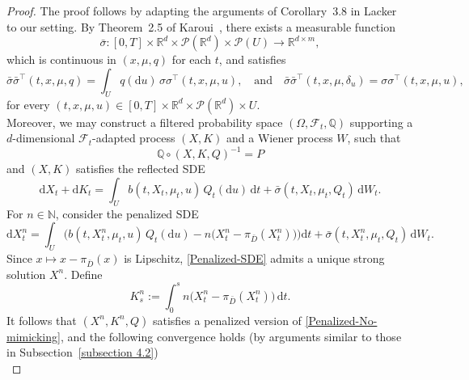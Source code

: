 \documentclass[11pt,amsfonts]{article}
\theoremstyle{plain}
\theoremstyle{assumpstyle}
\numberwithin{equation}{section}
\numberwithin{theorem}{section}
\numberwithin{proposition}{section}
\numberwithin{definition}{section}
\numberwithin{remark}{section}
\numberwithin{corollary}{section}
\numberwithin{lemma}{section}
\begin{document}
\begin{proof} The proof follows by adapting the arguments of Corollary~3.8 in Lacker~\cite{laker} to our setting. By Theorem~2.5 of Karoui~\cite{Mel}, there exists a measurable function 
\begin{equation*}
\bar{\sigma} : [0,T] \times \mathbb{R}^d \times \mathcal{P}(\mathbb{R}^d) \times \mathcal{P}(U) \to \mathbb{R}^{d \times m}, 
\end{equation*}
which is continuous in $(x,\mu,q)$ for each $t$, and satisfies 
\begin{equation*} 
\bar{\sigma} \bar{\sigma}^{\top}(t, x, \mu, q) = \int_{U} q(\mathrm{d}u)\, \sigma\sigma^{\top}(t, x, \mu, u), \quad\text{and}\quad \bar{\sigma} \bar{\sigma}^{\top}(t, x, \mu, \delta_{u}) = \sigma\sigma^{\top}(t, x, \mu, u), 
\end{equation*} 
for every $(t, x, \mu, u) \in [0,T] \times \mathbb{R}^d \times \mathcal{P}(\mathbb{R}^d) \times U$.\\
Moreover, we may construct a filtered probability space $(\Omega, \mathcal{F}_t, \mathbb{Q})$ supporting a $d$-dimensional $\mathcal{F}_t$-adapted process $(X, K)$ and a Wiener process $W$, such that
\begin{equation*} 
\mathbb{Q} \circ (X, K, Q)^{-1} = P 
\end{equation*}
and $(X,K)$ satisfies the reflected SDE \begin{equation} \label{Penalized-No-mimicking}  \displaystyle \mathrm{d}X_t+ \mathrm{d}K_t = \int_{U} b(t, X_t, \mu_t, u)\, Q_t(\mathrm{d}u)\, \mathrm{d}t + \bar{\sigma}(t, X_t, \mu_t, Q_t)\, \mathrm{d}W_t .
\end{equation}
For $n \in \mathbb{N}$, consider the penalized SDE 
\begin{equation} \label{Penalized-SDE} \mathrm{d}X^n_t = \int_{U} \big( b(t, X^n_t, \mu_t, u)\, Q_t(\mathrm{d}u) - n \big( X^n_t - \pi_{\bar{D}}(X^n_t) \big) \big) \mathrm{d}t + \bar{\sigma}(t, X^n_t, \mu_t, Q_t) \, \mathrm{d}W_t. 
\end{equation} 
 Since $x \mapsto x - \pi_{\bar{D}}(x)$ is Lipschitz, \eqref{Penalized-SDE} admits a unique strong solution $X^n$. Define \begin{equation*}
K^n_s := \int_{0}^{s} n \big( X^n_t - \pi_{\bar{D}}(X^n_t) \big) \, \mathrm{d}t.
\end{equation*}
It follows that $(X^n, K^n, Q)$ satisfies a penalized version of \eqref{Penalized-No-mimicking}, and the following convergence holds (by arguments similar to those in Subsection~\ref{subsection 4.2}) \begin{equation}\label{conv1}

\end{equation}
\end{proof}
\end{document}
